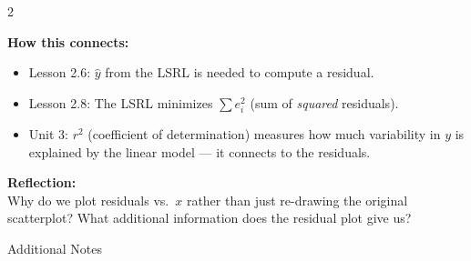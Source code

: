 \documentclass[10pt]{article}
\begin{document}
\begin{spiralbox}
\small
\begin{multicols}{2}

\textbf{How this connects:}
\begin{itemize}[itemsep=3pt]
  \item Lesson 2.6: $\hat{y}$ from the LSRL is needed to compute a residual.
  \item Lesson 2.8: The LSRL minimizes $\sum e_i^2$ (sum of \textit{squared} residuals).
  \item Unit 3: $r^2$ (coefficient of determination) measures how much variability in $y$
        is explained by the linear model --- it connects to the residuals.
\end{itemize}

\columnbreak

\textbf{Reflection:}\\
Why do we plot residuals vs.\ $x$ rather than just re-drawing the original scatterplot?
What additional information does the residual plot give us?\\[2pt]

\end{multicols}
\end{spiralbox}

\vspace{0.1in}

\begin{notesbox}{Additional Notes}
\vspace{0pt}
\writeline\\\writeline\\\writeline\\\writeline\\\writeline\\\writeline
\end{notesbox}
\end{document}
